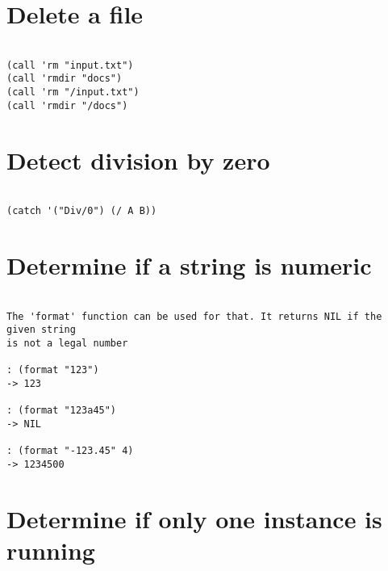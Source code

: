 \section*{Delete a file}

\begin{verbatim}

(call 'rm "input.txt")
(call 'rmdir "docs")
(call 'rm "/input.txt")
(call 'rmdir "/docs")

\end{verbatim}

\section*{Detect division by zero}

\begin{verbatim}

(catch '("Div/0") (/ A B))

\end{verbatim}

\section*{Determine if a string is numeric}

\begin{verbatim}

The 'format' function can be used for that. It returns NIL if the given string
is not a legal number

: (format "123")
-> 123

: (format "123a45")
-> NIL

: (format "-123.45" 4)
-> 1234500

\end{verbatim}

\section*{Determine if only one instance is running}

